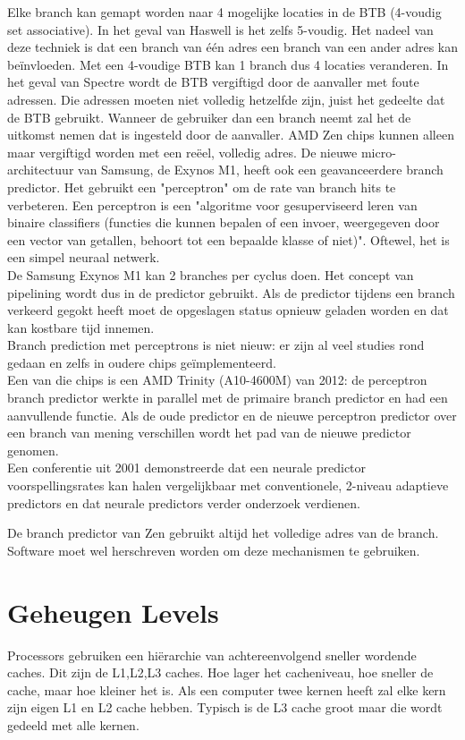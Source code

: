 Elke branch kan gemapt worden naar 4 mogelijke locaties in de BTB (4-voudig set associative).
In het geval van Haswell is het zelfs 5-voudig.
 Het nadeel van deze techniek is dat een branch van één adres een branch van een ander adres kan beïnvloeden. Met een 4-voudige BTB kan 1 branch dus 4 locaties veranderen. In het geval van Spectre wordt de BTB vergiftigd door de aanvaller met foute adressen. Die adressen moeten niet volledig hetzelfde zijn, juist het gedeelte dat de BTB gebruikt. Wanneer de gebruiker dan een branch neemt zal het de uitkomst nemen dat is ingesteld door de aanvaller. AMD Zen chips kunnen alleen maar vergiftigd worden met een reëel, volledig adres.
De nieuwe micro-architectuur van Samsung, de Exynos M1, heeft ook een geavanceerdere branch predictor. Het gebruikt een "perceptron" om de rate van branch hits te verbeteren.
Een perceptron is een "algoritme voor gesuperviseerd leren van binaire classifiers (functies die kunnen bepalen of een invoer, weergegeven door een vector van getallen, behoort tot een bepaalde klasse of niet)".\parencite{Freund1999}
Oftewel, het is een simpel neuraal netwerk. \\
De Samsung Exynos M1 kan 2 branches per cyclus doen. Het concept van pipelining wordt dus in de predictor gebruikt.
Als de predictor tijdens een branch verkeerd gegokt heeft moet de opgeslagen status opnieuw geladen worden en dat kan kostbare tijd innemen.\\
Branch prediction met perceptrons is niet nieuw: er zijn al veel studies rond gedaan en zelfs in oudere chips geïmplementeerd.\\ Een van die chips is een AMD Trinity (A10-4600M) van 2012: de perceptron branch predictor werkte in parallel met de primaire branch predictor en had een aanvullende functie. 
Als de oude predictor en de nieuwe perceptron predictor over een branch van mening verschillen wordt het pad van de nieuwe predictor genomen.\\
Een conferentie uit 2001 demonstreerde dat een neurale predictor voorspellingsrates kan halen vergelijkbaar met conventionele, 2-niveau adaptieve predictors en dat neurale predictors verder onderzoek verdienen. \parencite{Steven2001}


 De branch predictor van Zen gebruikt altijd het volledige adres van de branch.
Software moet wel herschreven worden om deze mechanismen te gebruiken.

\parencite{Intel2018}

\section{Geheugen Levels}
Processors gebruiken een hiërarchie van achtereenvolgend sneller wordende caches. Dit zijn de L1,L2,L3 caches.
Hoe lager het cacheniveau, hoe sneller de cache, maar hoe kleiner het is. Als een computer twee kernen heeft zal elke kern zijn eigen L1 en L2 cache hebben. Typisch is de L3 cache groot maar die wordt gedeeld met alle kernen.


